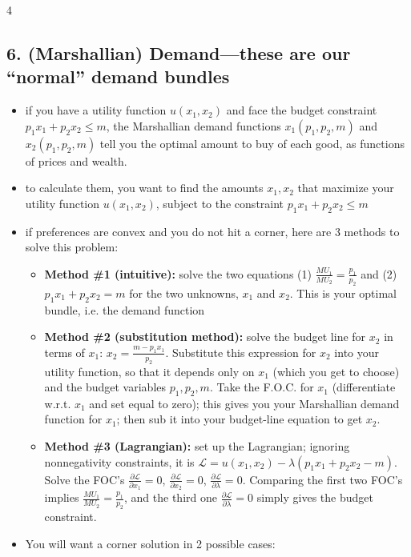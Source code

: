 \documentclass[8pt,landscape]{extarticle}
\begin{document}
\begin{multicols}{4}
\subsection*{6. (Marshallian) Demand---these are our ``normal'' demand bundles}
\begin{itemize}[leftmargin=*,noitemsep,topsep=0pt]
\item if you have a utility function $u(x_1,x_2)$ and face the budget constraint $p_1 x_1 + p_2 x_2 \leq m$, the Marshallian demand functions $x_1(p_1,p_2,m)$ and $x_2(p_1,p_2,m)$ tell you the optimal amount to buy of each good, as functions of prices and wealth.
\item to calculate them, you want to find the amounts $x_1,x_2$ that maximize your utility function $u(x_1,x_2)$, subject to the constraint $p_1 x_1 + p_2 x_2 \leq m$
\item if preferences are convex and you do not hit a corner, here are 3 methods to solve this problem:
\begin{itemize}[leftmargin=*,noitemsep,topsep=0pt]
\item \textbf{Method \#1 (intuitive):} solve the two equations (1) $\frac{MU_1}{MU_2} = \frac{p_1}{p_2}$ and (2) $p_1 x_1 + p_2 x_2 = m$ for the two unknowns, $x_1$ and $x_2$. This is your optimal bundle, i.e. the demand function
\item \textbf{Method \#2 (substitution method):} solve the budget line for $x_2$ in terms of $x_1$: $x_2 = \frac{m - p_1 x_1}{p_2}$. Substitute this expression for $x_2$ into your utility function, so that it depends only on $x_1$ (which you get to choose) and the budget variables $p_1,p_2,m$. Take the F.O.C. for $x_1$ (differentiate w.r.t. $x_1$ and set equal to zero); this gives you your Marshallian demand function for $x_1$; then sub it into your budget-line equation to get $x_2$.
\item \textbf{Method \#3 (Lagrangian):} set up the Lagrangian; ignoring nonnegativity constraints, it is $\mathcal{L} = u(x_1,x_2) - \lambda(p_1 x_1 + p_2 x_2 - m)$. Solve the FOC's $\frac{\partial \mathcal{L}}{\partial x_1} = 0$, $\frac{\partial \mathcal{L}}{\partial x_2} = 0$, $\frac{\partial \mathcal{L}}{\partial \lambda} = 0$. Comparing the first two FOC's implies $\frac{MU_1}{MU_2} = \frac{p_1}{p_2}$, and the third one $\frac{\partial \mathcal{L}}{\partial \lambda} = 0$ simply gives the budget constraint.
\end{itemize}
\item You will want a corner solution in 2 possible cases:
\begin{itemize}[leftmargin=*,noitemsep,topsep=0pt]

\end{itemize}
\end{itemize}
\end{multicols}
\end{document}
